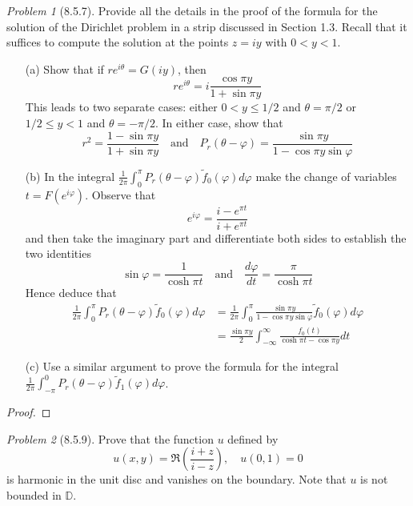 \documentclass[10pt]{article}
\newcommand{\sk}{\vskip 10mm}
\newcommand{\bb}[1]{\mathbb{#1}}
\newcommand{\wt}[1]{\widetilde{#1}}
\theoremstyle{remark}
\newtheorem{problem}{Problem}
\theoremstyle{remark}
\begin{document}
\begin{problem}[8.5.7]
  Provide all the details in the proof of the formula for the solution of
  the Dirichlet problem in a strip discussed in Section 1.3. Recall that
  it suffices to compute the solution at the points $z=iy$ with $0<y<1$.
  \begin{enumerate}
  \item[(a)] Show that if $re^{i\theta}=G(iy)$, then
    \[
      re^{i\theta}=i\frac{\cos\pi y}{1+\sin\pi y}
    \]
    This leads to two separate cases: either $0<y\leq 1/2$ and $\theta=\pi/2$
    or $1/2\leq y<1$ and $\theta=-\pi/2$. In either case, show that
    \[
      r^2=\frac{1-\sin\pi y}{1+\sin\pi y}\quad \text{and}\quad P_r(\theta-\varphi)=\frac{\sin\pi y}{1-\cos\pi y\sin\varphi}
    \]
  \item[(b)] In the integral
    $\frac{1}{2\pi}\int_0^\pi P_r(\theta-\varphi)\wt{f}_0(\varphi)d\varphi$
    make the change of variables $t=F(e^{i\varphi})$. Observe that
    \[
      e^{i\varphi}=\frac{i-e^{\pi t}}{i+e^{\pi t}}
    \]
    and then take the imaginary part and differentiate both sides to establish
    the two identities
    \[
      \sin\varphi = \frac{1}{\cosh \pi t}\quad \text{and}\quad \frac{d\varphi}{dt}=\frac{\pi}{\cosh\pi t}
    \]
    Hence deduce that
    \begin{align*}
      \frac{1}{2\pi}\int_0^\pi P_r(\theta-\varphi)\wt{f}_0(\varphi)d\varphi &=\frac{1}{2\pi}\int_0^\pi\frac{\sin\pi y}{1-\cos\pi y\sin\varphi}\wt{f}_0(\varphi)d\varphi\\
                                             &=\frac{\sin\pi y}{2}\int_{-\infty}^\infty\frac{f_0(t)}{\cosh\pi t-\cos\pi y}dt
    \end{align*}
  \item[(c)] Use a similar argument to prove the formula for the integral
    $\frac{1}{2\pi}\int_{-\pi}^0 P_r(\theta-\varphi)\wt{f}_1(\varphi)d\varphi$.
  \end{enumerate}
\end{problem}

\begin{proof}
  
\end{proof}

\sk

\begin{problem}[8.5.9]
  Prove that the function $u$ defined by
  \[
    u(x,y)=\Re(\frac{i+z}{i-z}),\quad u(0,1)=0
  \]
  is harmonic in the unit disc and vanishes on the boundary. Note that
  $u$ is not bounded in $\bb{D}$.
\end{problem}
\end{document}
